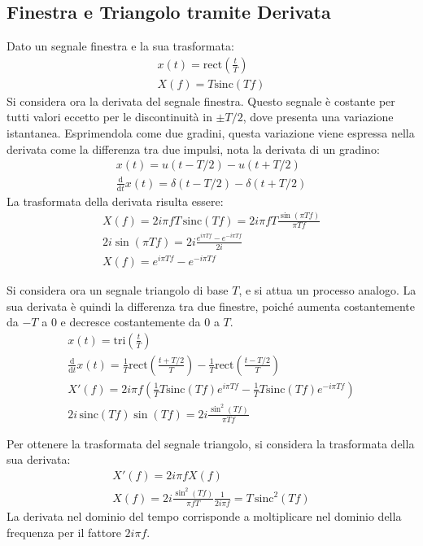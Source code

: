 \documentclass{article}
\newcommand{\rect}{\mathrm{rect}}
\newcommand{\sinc}{\mathrm{sinc}}
\newcommand{\tri}{\mathrm{tri}}
\newcommand{\df}{\mathrm{d}}
\numberwithin{equation}{subsection}
\begin{document}
\subsection{Finestra e Triangolo tramite Derivata}
Dato un segnale finestra e la sua trasformata:
\begin{gather*}
    x(t)=\rect\displaystyle\left(\frac{t}{T}\right)\\
    X(f)=T\sinc\displaystyle\left(Tf\right)
\end{gather*}
Si considera ora la derivata del segnale finestra. Questo segnale è costante per tutti valori eccetto per le discontinuità in $\pm T/2$, dove presenta una variazione istantanea. 
Esprimendola come due gradini, questa variazione viene espressa nella derivata come la differenza tra due impulsi, nota la derivata di un gradino: 
\begin{gather*}
    x(t)=u(t-T/2)-u(t+T/2)\\
    \displaystyle\frac{\df}{\df t}x(t)=\delta(t-T/2)-\delta(t+T/2)
\end{gather*}
La trasformata della derivata risulta essere:
\begin{gather*}
    X(f)=2i\pi fT\,\sinc(Tf)=\displaystyle2i\pi fT\frac{\sin(\pi Tf)}{\pi Tf}\\
    2i\sin(\pi Tf)=2i\frac{e^{i\pi Tf}-e^{-i\pi Tf}}{2i}\\
    X(f)=e^{i\pi Tf}-e^{-i\pi Tf}
\end{gather*}


Si considera ora un segnale triangolo di base $T$, e si attua un processo analogo. La sua derivata è quindi la differenza tra due finestre, poiché aumenta costantemente da 
$-T$ a $0$ e decresce costantemente da $0$ a $T$. 
\begin{gather*}
    x(t)=\tri \displaystyle\left(\frac{t}{T}\right)\\
    \displaystyle\frac{\df}{\df t}x(t)=\frac{1}{T}\rect\left(\frac{t+T/2}{T}\right)-\frac{1}{T}\rect\left(\frac{t-T/2}{T}\right)\\
    X'(f)=2i\pi f\displaystyle\left(\frac{1}{T}T\sinc(Tf)e^{i\pi Tf}-\frac{1}{T}T\sinc(Tf)e^{-i\pi Tf}\right)\\
    2i\,\sinc(Tf)\sin(Tf)=\displaystyle2i\frac{\sin^2(Tf)}{\pi Tf}
\end{gather*}

Per ottenere la trasformata del segnale triangolo, si considera la trasformata della sua derivata:
\begin{gather*}
    X'(f)=2i\pi fX(f)\\
    X(f)=\displaystyle2i\frac{\sin^2(Tf)}{\pi fT}\frac{1}{2i\pi f}=T\,\sinc^2(Tf)
\end{gather*}
La derivata nel dominio del tempo corrisponde a moltiplicare nel dominio della frequenza per il fattore $2i\pi f$. 
\end{document}
